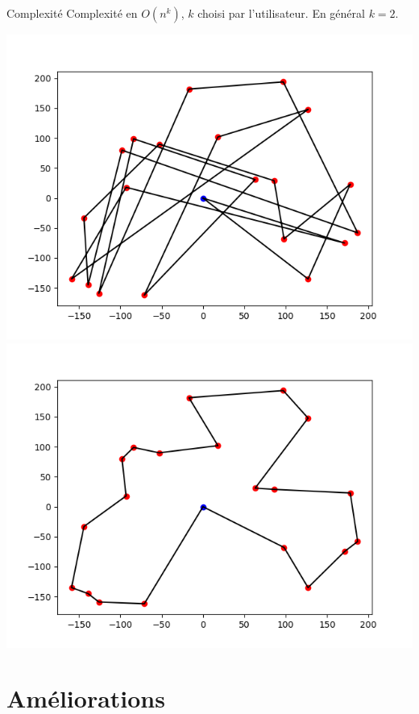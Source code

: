 \documentclass{beamer}
\begin{document}
\begin{frame}
\begin{alertblock}{Complexité}
Complexité en $O(n^k)$, $k$ choisi par l'utilisateur. En général $k=2$.
\end{alertblock}

\begin{center}
\includegraphics[scale=0.32]{test4_20_init.png}
\includegraphics[scale=0.32]{test4_20_LKopt.png}
\end{center}

\end{frame}


\section{Améliorations}
\end{document}
